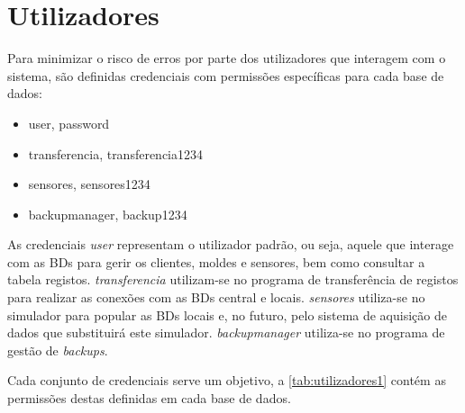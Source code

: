 \documentclass[11pt,twoside,a4paper]{report}
\begin{document}
\section{Utilizadores}
Para minimizar o risco de erros por parte dos utilizadores que interagem com o sistema, são definidas credenciais com permissões específicas para cada base de dados:
\begin{itemize}[noitemsep]
	\item user, password
	\item transferencia, transferencia1234
	\item sensores, sensores1234
	\item backupmanager, backup1234
\end{itemize}
As credenciais \textit{user} representam o utilizador padrão, ou seja, aquele que interage com as BDs para gerir os clientes, moldes e sensores, bem como consultar a tabela registos. \textit{transferencia} utilizam-se no programa de transferência de registos para realizar as conexões com as BDs central e locais. \textit{sensores} utiliza-se no simulador para popular as BDs locais e, no futuro, pelo sistema de aquisição de dados que substituirá este simulador. \textit{backupmanager} utiliza-se no programa de gestão de \textit{backups}.\par 
Cada conjunto de credenciais serve um objetivo, a \autoref{tab:utilizadores1} contém as permissões destas definidas em cada base de dados.
\end{document}
